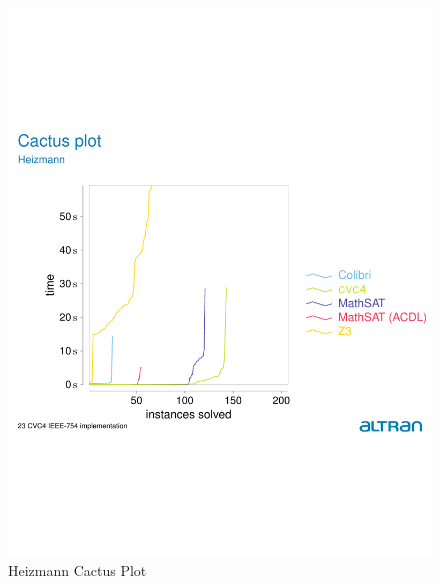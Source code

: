 \documentclass{easychair}
\begin{document}
\begin{figure}[h]
\caption{Heizmann Cactus Plot\label{CVC23}}
\vskip-100pt
\includegraphics[scale=0.8]{ExtractCVC23.pdf}
\end{figure}
\end{document}
